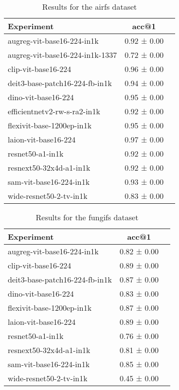 \begin{table}[htbp]
\caption{Results for the airfs dataset}
\begin{tabular}{|l|c|c|}\hline
Experiment & acc@1\\
\hline
augreg-vit-base16-224-in1k & 0.92 ± 0.00\\
\hline
augreg-vit-base16-224-in1k-1337 & 0.72 ± 0.00\\
\hline
clip-vit-base16-224 & 0.96 ± 0.00\\
\hline
deit3-base-patch16-224-fb-in1k & 0.94 ± 0.00\\
\hline
dino-vit-base16-224 & 0.95 ± 0.00\\
\hline
efficientnetv2-rw-s-ra2-in1k & 0.92 ± 0.00\\
\hline
flexivit-base-1200ep-in1k & 0.95 ± 0.00\\
\hline
laion-vit-base16-224 & 0.97 ± 0.00\\
\hline
resnet50-a1-in1k & 0.92 ± 0.00\\
\hline
resnext50-32x4d-a1-in1k & 0.92 ± 0.00\\
\hline
sam-vit-base16-224-in1k & 0.93 ± 0.00\\
\hline
wide-resnet50-2-tv-in1k & 0.83 ± 0.00\\
\hline
\end{tabular}
\end{table}

\begin{table}[htbp]
\caption{Results for the fungifs dataset}
\begin{tabular}{|l|c|c|}\hline
Experiment & acc@1\\
\hline
augreg-vit-base16-224-in1k & 0.82 ± 0.00\\
\hline
clip-vit-base16-224 & 0.89 ± 0.00\\
\hline
deit3-base-patch16-224-fb-in1k & 0.87 ± 0.00\\
\hline
dino-vit-base16-224 & 0.83 ± 0.00\\
\hline
flexivit-base-1200ep-in1k & 0.87 ± 0.00\\
\hline
laion-vit-base16-224 & 0.89 ± 0.00\\
\hline
resnet50-a1-in1k & 0.76 ± 0.00\\
\hline
resnext50-32x4d-a1-in1k & 0.81 ± 0.00\\
\hline
sam-vit-base16-224-in1k & 0.85 ± 0.00\\
\hline
wide-resnet50-2-tv-in1k & 0.45 ± 0.00\\
\hline
\end{tabular}
\end{table}

